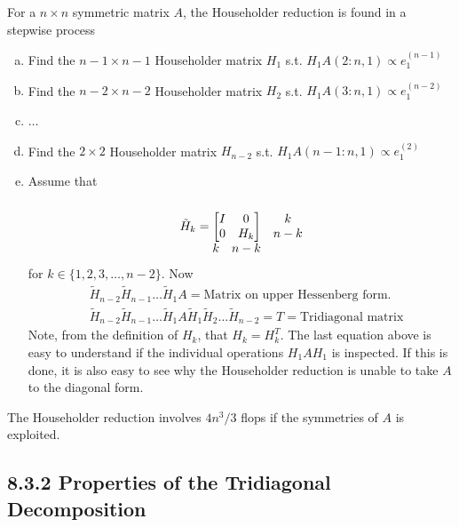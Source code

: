 For a $n\times n$ symmetric matrix $A$, the Householder reduction is found in a stepwise process
\begin{enumerate}[(a):]
	\item Find the $n-1\times n-1$ Householder matrix $H_1$ s.t. $H_1A(2:n,1)\propto e_1^{(n-1)}$
	\item Find the $n-2\times n-2$ Householder matrix $H_2$ s.t. $H_1A(3:n,1)\propto e_1^{(n-2)}$
	\item $\dots$
	\item Find the $2\times 2$ Householder matrix $H_{n-2}$ s.t. $H_1A(n-1:n,1)\propto e_1^{(2)}$
	\item Assume that
	\begin{equation}
	\tilde H_k =	
	\begin{matrix}
		\\	
		\left[\begin{matrix} I & 0 \\ 0 & H_{k} \end{matrix}\right]
		&
		\begin{matrix}		
			k \\ n-k
		\end{matrix}
		\\
		\begin{matrix}		
			k & n-k
		\end{matrix}
	\end{matrix}
	\end{equation}
	for $k \in \{1,2,3,\dots,n-2\}$. Now
	\begin{align}
		&\tilde H_{n-2} \tilde H_{n-1} \dots \tilde H_1 A = \text{Matrix on upper Hessenberg form.}\\
		&\tilde H_{n-2} \tilde H_{n-1} \dots \tilde H_1 A 
			\tilde H_{1} \tilde H_{2} \dots \tilde H_{n-2} = T = \text{Tridiagonal matrix}
	\end{align}
Note, from the definition of $H_k$, that $H_k=H_k^T$. The last equation above is easy
to understand if the individual operations $H_1AH_1$ is inspected. If this is done, it is also easy 
to see why the Householder reduction is unable to take $A$ to the diagonal form.
\end{enumerate}
The Householder reduction involves $4n^3/3$ flops if the symmetries of $A$ is exploited.


\subsection*{8.3.2 Properties of the Tridiagonal Decomposition}%

